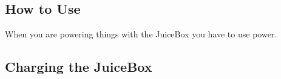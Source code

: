 \documentclass[../jb_user_manual.tex]{subfiles}
\begin{document}
\subsection{How to Use} 
When you are powering things with the JuiceBox you have to use power.
\subsection{Charging the JuiceBox}
\end{document}
